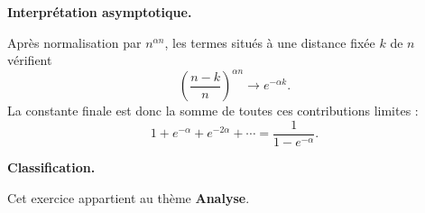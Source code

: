 \documentclass[11pt,a4paper]{article}
\newcommand{\1}{\mathbf{1}}
\begin{document}
\begin{remarquebox}
\textbf{Interpr\'etation asymptotique.}

Apr\`es normalisation par \(n^{\alpha n}\), les termes situ\'es
\`a une distance fix\'ee \(k\) de \(n\) v\'erifient
\[
\left(\frac{n-k}{n}\right)^{\alpha n}
\longrightarrow e^{-\alpha k}.
\]
La constante finale est donc la somme de toutes ces
contributions limites :
\[
1+e^{-\alpha}+e^{-2\alpha}+\cdots
=
\frac{1}{1-e^{-\alpha}}.
\]
\end{remarquebox}

\begin{remarquebox}
\textbf{Classification.}

Cet exercice appartient au th\`eme \textbf{Analyse}.
\end{remarquebox}
\end{document}
